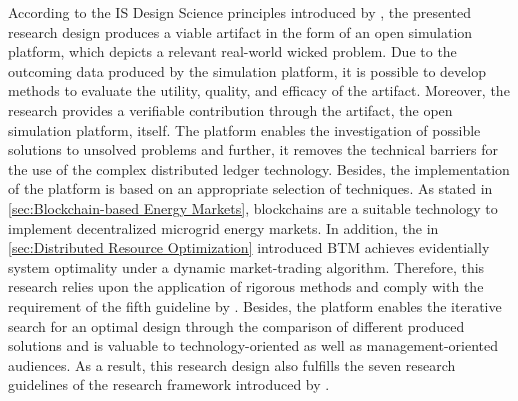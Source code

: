 According to the IS Design Science principles introduced by , 
the presented research design produces a viable artifact in the form of an open simulation platform, which depicts a 
relevant real-world wicked problem. Due to the outcoming data produced by the simulation platform, 
it is possible to develop methods to evaluate the utility, quality, and efficacy of the artifact. 
Moreover, the research provides a verifiable contribution through the artifact, the open simulation platform, itself. 
The platform enables the investigation of possible solutions to unsolved problems and further, 
it removes the technical barriers for the use of the complex distributed ledger technology. 
Besides, the implementation of the platform is based on an appropriate selection of techniques. 
As stated in \ref{sec:Blockchain-based Energy Markets}, 
blockchains are a suitable technology to implement decentralized microgrid energy markets. 
In addition, the in \ref{sec:Distributed Resource Optimization} introduced BTM achieves evidentially system 
optimality under a dynamic market-trading algorithm. 
Therefore, this research relies upon the application of rigorous methods and comply with the requirement 
of the fifth guideline by . 
Besides, the platform enables the iterative search for an optimal design through the comparison 
of different produced solutions and is valuable to technology-oriented as well as management-oriented 
audiences. As a result, this research design also fulfills the seven research guidelines of 
the research framework introduced by . 
